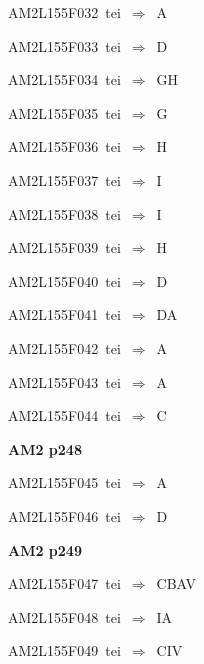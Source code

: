 {\sixrm AM2L155F032\ {\sixit tei}\ }$\Rightarrow$\ A\par\smallskip
{\sixrm AM2L155F033\ {\sixit tei}\ }$\Rightarrow$\ D\par\smallskip
{\sixrm AM2L155F034\ {\sixit tei}\ }$\Rightarrow$\ GH\par\smallskip
{\sixrm AM2L155F035\ {\sixit tei}\ }$\Rightarrow$\ G\par\smallskip
{\sixrm AM2L155F036\ {\sixit tei}\ }$\Rightarrow$\ H\par\smallskip
{\sixrm AM2L155F037\ {\sixit tei}\ }$\Rightarrow$\ I\par\smallskip
{\sixrm AM2L155F038\ {\sixit tei}\ }$\Rightarrow$\ I\par\smallskip
{\sixrm AM2L155F039\ {\sixit tei}\ }$\Rightarrow$\ H\par\smallskip
{\sixrm AM2L155F040\ {\sixit tei}\ }$\Rightarrow$\ D\par\smallskip
{\sixrm AM2L155F041\ {\sixit tei}\ }$\Rightarrow$\ DA\par\smallskip
{\sixrm AM2L155F042\ {\sixit tei}\ }$\Rightarrow$\ A\par\smallskip
{\sixrm AM2L155F043\ {\sixit tei}\ }$\Rightarrow$\ A\par\smallskip
{\sixrm AM2L155F044\ {\sixit tei}\ }$\Rightarrow$\ C\par\smallskip

\par\vfill\eject
{\bf\hfill AM2 p248\hfill\hbox{}}\par\bigskip
{\sixrm AM2L155F045\ {\sixit tei}\ }$\Rightarrow$\ A\par\smallskip
{\sixrm AM2L155F046\ {\sixit tei}\ }$\Rightarrow$\ D\par\smallskip

\par\vfill\eject
{\bf\hfill AM2 p249\hfill\hbox{}}\par\bigskip
{\sixrm AM2L155F047\ {\sixit tei}\ }$\Rightarrow$\ CBAV\par\smallskip
{\sixrm AM2L155F048\ {\sixit tei}\ }$\Rightarrow$\ IA\par\smallskip
{\sixrm AM2L155F049\ {\sixit tei}\ }$\Rightarrow$\ CIV\par\smallskip

